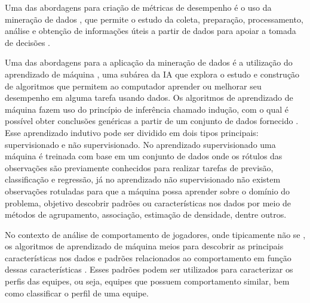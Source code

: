 Uma das abordagens para  criação de métricas de desempenho é o uso da mineração de dados \cite{el2016game}, que permite o estudo da coleta, preparação, processamento, análise e obtenção de informações úteis a partir de dados para apoiar a tomada de decisões \cite{aggarwal2015data}.

Uma das abordagens para a aplicação da mineração de dados é a utilização do aprendizado de máquina \cite{aggarwal2015data}, uma subárea da IA que explora o estudo e construção de algoritmos que permitem ao computador aprender ou melhorar seu desempenho em alguma tarefa usando dados. Os algoritmos de aprendizado de máquina fazem uso do princípio de inferência chamado indução, com o qual é possível obter conclusões genéricas a partir de um conjunto de dados fornecido \cite{lorena2007introduccao}. Esse aprendizado indutivo pode ser dividido em dois tipos principais: supervisionado e não supervisionado. No aprendizado supervisionado uma máquina é treinada com base em um conjunto de dados onde os rótulos das observações são previamente conhecidos para realizar tarefas de previsão, classificação e regressão, já no aprendizado não supervisionado não existem observações rotuladas para que a máquina possa aprender sobre o domínio do problema,  objetivo  descobrir padrões ou características nos dados \cite{sathya2013comparison} por meio de métodos de agrupamento, associação, estimação de densidade, dentre outros.

No contexto de análise de comportamento de jogadores, onde tipicamente não se , os algoritmos de aprendizado de máquina  meios para descobrir as principais características nos dados e padrões relacionados ao comportamento em função dessas características \cite{el2016game}. Esses padrões podem ser utilizados para caracterizar os perfis das equipes, ou seja, equipes que possuem comportamento similar, bem como classificar o perfil de uma equipe.

